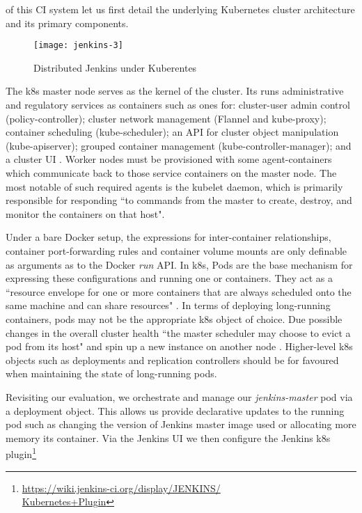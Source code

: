 \documentclass{report}
\begin{document}
of this CI system let us first detail the underlying Kubernetes cluster architecture
and its primary components.
\begin{figure}[htp]
      \centering
      \texttt{[image: jenkins-3]}
      \caption{Distributed Jenkins under Kuberentes} 
      \label{fig:jenkins-3}
\end{figure}
\par
The k8s master node serves as the kernel of the cluster.
Its runs administrative and regulatory services as containers 
such as ones for: cluster-user admin control (policy-controller); cluster network 
management (Flannel and kube-proxy); 
container scheduling (kube-scheduler); an API for cluster object manipulation (kube-apiserver);
grouped container management  (kube-controller-manager); and a cluster UI \citep{Verma}. 
Worker nodes must be provisioned with some
agent-containers which communicate back to those service containers
on the master node. The most notable of such required agents is the kubelet daemon,
which is primarily responsible for responding ``to commands from the master
to create, destroy, and monitor the containers on that host".
\par
Under a bare Docker setup, the expressions for inter-container relationships, 
container port-forwarding rules and
container volume mounts are only definable as arguments as to the Docker \textit{run}
API. In k8s, Pods are the base mechanism for expressing these configurations and running one or containers.
They act as a ``resource envelope for one or more containers that are always
scheduled onto the same machine and can share resources" \citep{Verma}.
In terms of deploying long-running containers, pods may not be the appropriate
k8s object of choice. Due possible changes in the overall cluster health 
``the master scheduler may choose to evict a pod from its host" and
spin up a new instance on another node \citep{Rensin}. Higher-level k8s objects 
such as deployments and replication controllers should be for favoured when
maintaining the state of long-running pods.
\par
Revisiting our evaluation, we orchestrate and manage
our \textit{jenkins-master} pod via a deployment object. This allows us provide
declarative updates to the running pod such as changing the version of Jenkins master image used or
allocating more memory its container. Via the Jenkins UI we then configure the Jenkins k8s plugin\footnote{\href{https://wiki.jenkins-ci.org/display/JENKINS/Kubernetes+Plugin}{https://wiki.jenkins-ci.org/display/JENKINS/\\Kubernetes+Plugin}}
\end{document}
